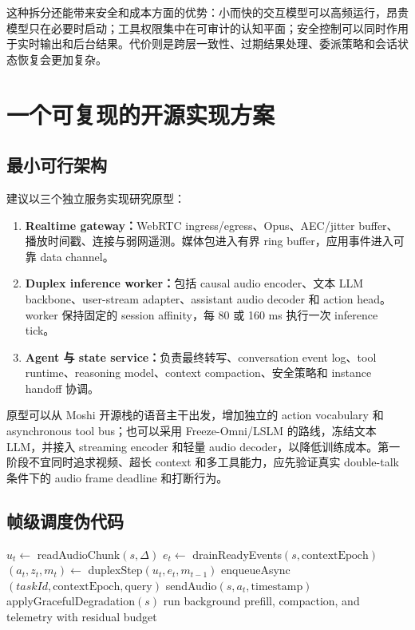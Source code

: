 这种拆分还能带来安全和成本方面的优势：小而快的交互模型可以高频运行，昂贵模型只在必要时启动；工具权限集中在可审计的认知平面；安全控制可以同时作用于实时输出和后台结果。代价则是跨层一致性、过期结果处理、委派策略和会话状态恢复会更加复杂。

\section{一个可复现的开源实现方案}

\subsection{最小可行架构}

建议以三个独立服务实现研究原型：

\begin{enumerate}
  \item \textbf{Realtime gateway：}WebRTC ingress/egress、Opus、AEC/jitter buffer、播放时间戳、连接与弱网遥测。媒体包进入有界 ring buffer，应用事件进入可靠 data channel。
  \item \textbf{Duplex inference worker：}包括 causal audio encoder、文本 LLM backbone、user-stream adapter、assistant audio decoder 和 action head。worker 保持固定的 session affinity，每 80 或 160 ms 执行一次 inference tick。
  \item \textbf{Agent 与 state service：}负责最终转写、conversation event log、tool runtime、reasoning model、context compaction、安全策略和 instance handoff 协调。
\end{enumerate}

原型可以从 Moshi 开源栈的语音主干出发\cite{defossez2024moshi}，增加独立的 action vocabulary 和 asynchronous tool bus；也可以采用 Freeze-Omni/LSLM 的路线，冻结文本 LLM，并接入 streaming encoder 和轻量 audio decoder，以降低训练成本\cite{wang2024freezeomni,ma2025lslm}。第一阶段不宜同时追求视频、超长 context 和多工具能力，应先验证真实 double-talk 条件下的 audio frame deadline 和打断行为。

\subsection{帧级调度伪代码}

\begin{algorithm}[H]
\caption{Deadline-aware duplex session loop}
\begin{algorithmic}[1]
  \State $u_t\gets$ readAudioChunk$(s,\Delta)$
  \State $e_t\gets$ drainReadyEvents$(s,\mathrm{contextEpoch})$
  \State $(a_t,z_t,m_t)\gets$ duplexStep$(u_t,e_t,m_{t-1})$
    \State enqueueAsync$(taskId,\mathrm{contextEpoch},\mathrm{query})$
  \EndIf
    \State sendAudio$(s,a_t,\mathrm{timestamp})$
  \Else
    \State applyGracefulDegradation$(s)$
  \EndIf
\EndFor
\State run background prefill, compaction, and telemetry with residual budget
\end{algorithmic}
\end{algorithm}

